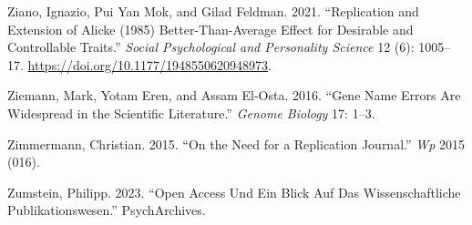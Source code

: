 \documentclass[
  letterpaper,
  DIV=11,
  numbers=noendperiod]{scrreprt}
\newlength{\cslhangindent}
\newenvironment{CSLReferences}[2] %
 {\begin{list}{}{%
  \setlength{\itemindent}{0pt}
  \setlength{\leftmargin}{0pt}
  \setlength{\parsep}{0pt}
  \ifodd #1
   \setlength{\leftmargin}{\cslhangindent}
   \setlength{\itemindent}{-1\cslhangindent}
  \fi
  \setlength{\itemsep}{#2\baselineskip}}}
 {\end{list}}
\begin{document}
\begin{CSLReferences}{1}{0}
Ziano, Ignazio, Pui Yan Mok, and Gilad Feldman. 2021. {``Replication and
Extension of Alicke (1985) Better-Than-Average Effect for Desirable and
Controllable Traits.''} \emph{Social Psychological and Personality
Science} 12 (6): 1005--17.
\url{https://doi.org/10.1177/1948550620948973}.

Ziemann, Mark, Yotam Eren, and Assam El-Osta. 2016. {``Gene Name Errors
Are Widespread in the Scientific Literature.''} \emph{Genome Biology}
17: 1--3.

Zimmermann, Christian. 2015. {``On the Need for a Replication
Journal.''} \emph{Wp} 2015 (016).

Zumstein, Philipp. 2023. {``Open Access Und Ein Blick Auf Das
Wissenschaftliche Publikationswesen.''} PsychArchives.

\end{CSLReferences}
\end{document}
